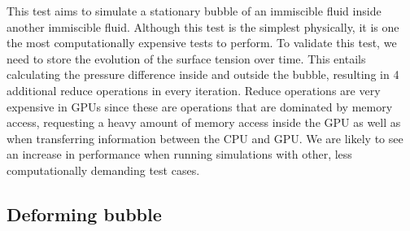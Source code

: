\documentclass[12pt]{book}
\begin{document}
This test aims to simulate a stationary bubble of an immiscible fluid inside another immiscible fluid. Although this test is the simplest physically, it is one the most computationally expensive tests to perform. To validate this test, we need to store the evolution of the surface tension over time. This entails calculating the pressure difference inside and outside the bubble, resulting in 4 additional reduce operations in every iteration. Reduce operations are very expensive in GPUs since these are operations that are dominated by memory access, requesting a heavy amount of memory access inside the GPU as well as when transferring information between the CPU and GPU. We are likely to see an increase in performance when running simulations with other, less computationally demanding test cases. 
\subsection{Deforming bubble}
\end{document}
